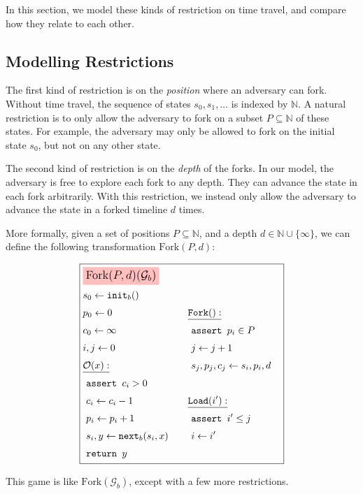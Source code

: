In this section, we model these kinds of restriction on time travel,
and compare how they relate to each other.

\subsection{Modelling Restrictions}

The first kind of restriction is on the \emph{position} where an
adversary can fork.
Without time travel, the sequence of states $s_0, s_1, \ldots$
is indexed by $\mathbb{N}$.
A natural restriction is to only allow the adversary to
fork on a subset $P \subseteq \mathbb{N}$ of these states.
For example, the adversary may only be allowed to fork on the initial
state $s_0$, but not on any other state.

The second kind of restriction is on the \emph{depth} of the forks.
In our model, the adversary is free to explore each fork to any depth.
They can advance the state in each fork arbitrarily.
With this restriction, we instead only allow the adversary to advance
the state in a forked timeline $d$ times.

More formally, given a set of positions $P \subseteq \mathbb{N}$, and
a depth
$ d \in \mathbb{N} \cup \{\infty\}$, we can define the following
transformation $\text{Fork}(P, d)$:

\begin{game}
\captionsetup{justification=centering}
$$
\boxed{
\begin{aligned}
&\colorbox{pink}{\large $\text{Fork}(P, d)(\mathcal{G}_b)$}\cr
&\begin{aligned}
    &s_0 \gets \texttt{init}_b()\cr
    &p_0 \gets 0\cr
    &c_0 \gets \infty\cr
    &i, j \gets 0\cr
    &\underline{\mathcal{O}(x):}\cr
    &\ \texttt{assert } c_i > 0\cr
    &\ c_i \gets c_i - 1\cr
    &\ p_i \gets p_i + 1\cr
    &\ s_i, y \gets \texttt{next}_b(s_i, x)\cr
    &\ \texttt{return } y\cr
\end{aligned}
&\begin{aligned}
    &\underline{\texttt{Fork}():}\cr
    &\ \texttt{assert } p_i \in P\cr
    &\ j \gets j + 1\cr
    &\ s_j, p_j, c_j \gets s_i, p_i, d\cr
    &\cr
    &\underline{\texttt{Load}(i'):}\cr
    &\ \texttt{assert } i' \leq j\cr
    &\ i \gets i'\cr
\end{aligned}\cr
\end{aligned}
}
$$
\caption{$\text{Fork}(\mathcal{G}_b)$}
\end{game}

This game is like $\text{Fork}(\mathcal{G}_b)$, except with a few more restrictions.

